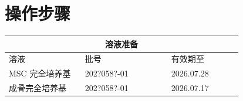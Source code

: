 \documentclass[UTF8,10pt,a4paper,fontset=fandol]{ctexart}
\newcommand{\fieldvalue}[1]{#1}
\newcommand{\handwritten}[1]{#1}
\begin{document}
\section{操作步骤}

\begin{tabular}{|p{0.30\linewidth}|p{0.34\linewidth}|p{0.29\linewidth}|}
\hline
\multicolumn{3}{c|}{溶液准备}\\
\hline
溶液 & 批号 & 有效期至\\
\hline
\fieldvalue{MSC 完全培养基} &
\fieldvalue{\handwritten{202?058?-01}} &
\fieldvalue{\handwritten{2026.07.28}}\\
\hline
\fieldvalue{成骨完全培养基} &
\fieldvalue{\handwritten{202?058?-01}} &
\fieldvalue{\handwritten{2026.07.17}}\\
\hline
\end{tabular}

\vspace{0.5em}
\end{document}
